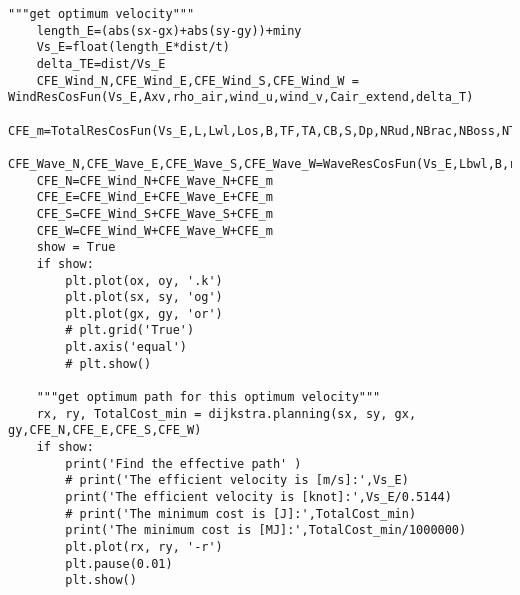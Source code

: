 \begin{lstlisting}[caption=Testing codes (\autoref{TestResults}), label=TestCodes]
    """get optimum velocity"""
    length_E=(abs(sx-gx)+abs(sy-gy))+miny
    Vs_E=float(length_E*dist/t)
    delta_TE=dist/Vs_E
    CFE_Wind_N,CFE_Wind_E,CFE_Wind_S,CFE_Wind_W = WindResCosFun(Vs_E,Axv,rho_air,wind_u,wind_v,Cair_extend,delta_T)
    CFE_m=TotalResCosFun(Vs_E,L,Lwl,Los,B,TF,TA,CB,S,Dp,NRud,NBrac,NBoss,NThr,rho_sea,nu_sea,g,delta_T)
    CFE_Wave_N,CFE_Wave_E,CFE_Wave_S,CFE_Wave_W=WaveResCosFun(Vs_E,Lbwl,B,rho_sea,wave_d,wave_h,delta_T)
    CFE_N=CFE_Wind_N+CFE_Wave_N+CFE_m
    CFE_E=CFE_Wind_E+CFE_Wave_E+CFE_m
    CFE_S=CFE_Wind_S+CFE_Wave_S+CFE_m
    CFE_W=CFE_Wind_W+CFE_Wave_W+CFE_m
    show = True
    if show:
        plt.plot(ox, oy, '.k')
        plt.plot(sx, sy, 'og')
        plt.plot(gx, gy, 'or')
        # plt.grid('True')
        plt.axis('equal')
        # plt.show()

    """get optimum path for this optimum velocity"""
    rx, ry, TotalCost_min = dijkstra.planning(sx, sy, gx, gy,CFE_N,CFE_E,CFE_S,CFE_W)
    if show:
        print('Find the effective path' )
        # print('The efficient velocity is [m/s]:',Vs_E)
        print('The efficient velocity is [knot]:',Vs_E/0.5144)
        # print('The minimum cost is [J]:',TotalCost_min)
        print('The minimum cost is [MJ]:',TotalCost_min/1000000)
        plt.plot(rx, ry, '-r')
        plt.pause(0.01)
        plt.show()
\end{lstlisting}